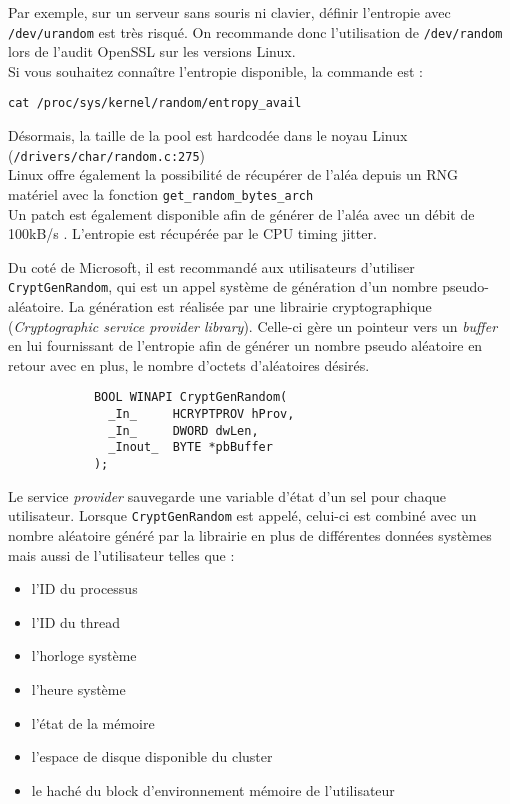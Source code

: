 			Par exemple, sur un serveur sans souris ni clavier, 
			définir l'entropie avec	\texttt{/dev/urandom} est très risqué. 
			On recommande donc l'utilisation de \texttt{/dev/random} lors de 
			l'audit OpenSSL sur les versions Linux.\\
	
			Si vous souhaitez connaître l'entropie disponible, la commande 
			est :
			\begin{center}
				\texttt{cat /proc/sys/kernel/random/entropy\_avail}
			\end{center}	
			
			Désormais, la taille de la pool est hardcodée dans le noyau Linux 
			(\texttt{/drivers/char/random.c:275})\\
			
			Linux offre également la possibilité de récupérer de l’aléa depuis 
			un RNG matériel avec la fonction \texttt{get\_random\_bytes\_arch}
			\cite{archlinuxRNG}\\
		
			Un patch est également disponible afin de générer de l'aléa avec un 
			débit de 100kB/s \cite{mueller2013rng}. 
			L'entropie est récupérée par le CPU timing jitter.\\
			
		
			Du coté de Microsoft, il est recommandé aux utilisateurs d'utiliser 
			\texttt{CryptGenRandom}, \cite{wikicryptgenrandom}
			qui est un appel système de génération d'un nombre pseudo-aléatoire. 
			La génération est réalisée par une librairie cryptographique
			 (\textit{Cryptographic service provider library}).
			Celle-ci gère un pointeur vers un \textit{buffer} en lui 
			fournissant de l'entropie afin de générer un nombre pseudo 
			aléatoire en retour avec en plus, le nombre	d'octets d'aléatoires
			désirés.
			
			\begin{verbatim}
			BOOL WINAPI CryptGenRandom(
			  _In_     HCRYPTPROV hProv,
			  _In_     DWORD dwLen,
			  _Inout_  BYTE *pbBuffer
			);
			\end{verbatim}
			
			Le service \textit{provider} sauvegarde une variable d'état d'un 
			sel pour chaque utilisateur. Lorsque \texttt{CryptGenRandom} est 
			appelé, celui-ci est combiné avec un nombre aléatoire généré par 
			la librairie en plus de différentes données systèmes mais aussi de 
			l'utilisateur telles que :\\
			\begin{itemize}
			\item l’ID du processus
			\item l'ID du thread
			\item l'horloge système
			\item l'heure système
			\item l'état de la mémoire
			\item l’espace de disque disponible du cluster
			\item le haché du block d'environnement mémoire de l’utilisateur\\
			\end{itemize} 
			
